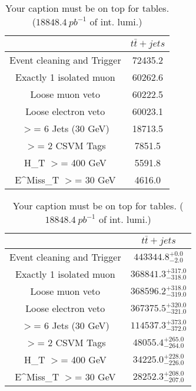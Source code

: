 \documentclass{article}
\begin{document}
\begin{table}
\caption{Your caption must be on top for tables. ($18848.4~pb^{-1}$ of int. lumi.)}
\label{tab:}
\centering
\begin{tabular}{|c|c|}
\toprule
&$t\bar{t}+jets$	\\

\midrule
Event cleaning and Trigger&	72435.2	\\

Exactly 1 isolated muon&	60262.6	\\

Loose muon veto&	60222.5	\\

Loose electron veto&	60023.1	\\

$>$= 6 Jets (30 GeV)&	18713.5	\\

$>$= 2 CSVM Tags&	7851.5	\\

H_{T} $>$=  400 GeV&	5591.8	\\

E^{Miss}_{T} $>$=  30 GeV&	4616.0	\\

\bottomrule
\end{tabular}
\end{table}
\begin{table}
\caption{Your caption must be on top for tables. ($18848.4~pb^{-1}$ of int. lumi.)}
\label{tab:}
\centering
\begin{tabular}{|c|c|}
\toprule
&$t\bar{t}+jets$	\\

\midrule
Event cleaning and Trigger&	$443344.8^{+0.0}_{-2.0}$	\\

Exactly 1 isolated muon&	$368841.3^{+317.0}_{-318.0}$	\\

Loose muon veto&	$368596.2^{+318.0}_{-319.0}$	\\

Loose electron veto&	$367375.5^{+320.0}_{-321.0}$	\\

$>$= 6 Jets (30 GeV)&	$114537.3^{+373.0}_{-372.0}$	\\

$>$= 2 CSVM Tags&	$48055.4^{+265.0}_{-264.0}$	\\

H_{T} $>$=  400 GeV&	$34225.0^{+228.0}_{-226.0}$	\\

E^{Miss}_{T} $>$=  30 GeV&	$28252.3^{+208.0}_{-207.0}$	\\

\bottomrule
\end{tabular}
\end{table}
\end{document}
